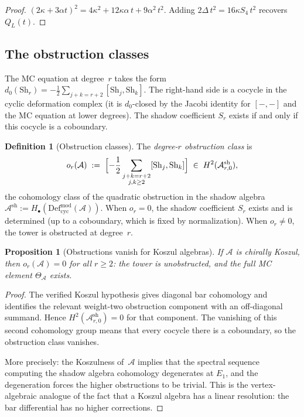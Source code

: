 \documentclass[11pt,reqno]{amsart}
\newtheorem{proposition}[theorem]{Proposition}
\theoremstyle{definition}
\newtheorem{definition}[theorem]{Definition}
\theoremstyle{remark}
\newcommand{\cA}{\mathcal{A}}
\newcommand{\Defcyc}{\mathrm{Def}_{\mathrm{cyc}}}
\newcommand{\Sh}{\mathrm{Sh}}
\numberwithin{equation}{section}
\begin{document}
\begin{proof}
$(2\kappa + 3\alpha t)^2 = 4\kappa^2 + 12\kappa\alpha\,t
+ 9\alpha^2\,t^2$.
Adding $2\Delta\,t^2 = 16\kappa S_4\,t^2$ recovers
$Q_L(t)$.
\end{proof}


\subsection{The obstruction
classes}\label{subsec:obstructions}

The MC equation at degree~$r$ takes the form
$d_0(\Sh_r) = -\frac{1}{2}\sum_{j+k=r+2} [\Sh_j, \Sh_k]$.
The right-hand side is a cocycle in the cyclic deformation
complex (it is $d_0$-closed by the Jacobi identity for
$[-,-]$ and the MC equation at lower degrees). The shadow
coefficient $S_r$ exists if and only if this cocycle is a
coboundary.

\begin{definition}[Obstruction
classes]\label{def:obstructions}
The \emph{degree-$r$ obstruction class} is
\[
 o_r(\cA)
 \;:=\;
 \Bigl[-\frac{1}{2}
 \sum_{\substack{j+k=r+2 \\ j,k \ge 2}}
 [\Sh_j, \Sh_k]\Bigr]
 \;\in\;
 H^2(\cA^{\mathrm{sh}}_{r,0}),
\]
the cohomology class of the quadratic obstruction in the
shadow algebra
$\cA^{\mathrm{sh}} := H_\bullet(
\Defcyc^{\mathrm{mod}}(\cA))$.
When $o_r = 0$, the shadow coefficient $S_r$ exists and is
determined (up to a coboundary, which is fixed by
normalization). When $o_r \ne 0$, the tower is
obstructed at degree~$r$.
\end{definition}

\begin{proposition}[Obstructions vanish for Koszul
algebras]\label{prop:obs-vanish}
If $\cA$ is chirally Koszul, then $o_r(\cA) = 0$ for all
$r \ge 2$: the tower is unobstructed, and the full MC
element $\Theta_\cA$ exists.
\end{proposition}

\begin{proof}
The verified Koszul hypothesis gives diagonal bar cohomology and
identifies the relevant weight-two obstruction component with an
off-diagonal summand. Hence
$H^2(\cA^{\mathrm{sh}}_{r,0}) = 0$ for that component. The
vanishing of this second cohomology group means that every
cocycle there is a coboundary, so the obstruction class vanishes.

More precisely: the Koszulness of~$\cA$ implies that the
spectral sequence computing the shadow algebra cohomology
degenerates at $E_1$, and the degeneration forces the
higher obstructions to be trivial. This is the
vertex-algebraic analogue of the fact that a Koszul algebra
has a linear resolution: the bar differential has no higher
corrections.
\end{proof}
\end{document}
